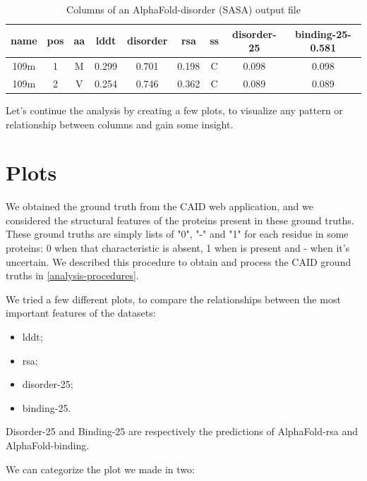\begin{table}[h!]
    \centering
    \begin{tabular}{c|c|c|c|c|c|c|c|c}
        \textbf{name} & \textbf{pos} & \textbf{aa} & \textbf{lddt} & \textbf{disorder} & \textbf{rsa} & \textbf{ss} & \textbf{disorder-25} & \textbf{binding-25-0.581} \\
        \hline
        109m & 1 & M & 0.299 & 0.701 & 0.198 & C & 0.098 & 0.098 \\
        109m & 2 & V & 0.254 & 0.746 & 0.362 & C & 0.089 & 0.089 \\
    \end{tabular}
    \caption{Columns of an AlphaFold-disorder (SASA) output file}
\end{table}

Let's continue the analysis by creating a few plots, to visualize any pattern or relationship between columns and gain some insight.

\section{Plots}
We obtained the ground truth from the CAID web application, and we considered the structural features of the proteins present in these ground truths. These ground truths are simply lists of "0", "-" and "1" for each residue in some proteins: 0 when that characteristic is absent, 1 when is present and - when it's uncertain. We described this procedure to obtain and process the CAID ground truths in \ref{analysis-procedures}.

We tried a few different plots, to compare the relationships between the most important features of the datasets: 

\begin{itemize}
    \item lddt;
    \item rsa;
    \item disorder-25;
    \item binding-25.
\end{itemize}

Disorder-25 and Binding-25 are respectively the predictions of AlphaFold-rsa and AlphaFold-binding.

We can categorize the plot we made in two:

